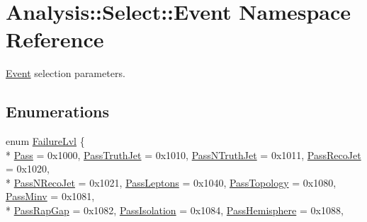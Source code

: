 \hypertarget{namespaceAnalysis_1_1Select_1_1Event}{}\section{Analysis\+:\+:Select\+:\+:Event Namespace Reference}
\label{namespaceAnalysis_1_1Select_1_1Event}


\hyperlink{namespaceAnalysis_1_1Select_1_1Event}{Event} selection parameters.  


\subsection*{Enumerations}
\begin{DoxyCompactItemize}
\item 
enum \hyperlink{namespaceAnalysis_1_1Select_1_1Event_a52c4d90d5d3ef88d9ca5c6a16798cbdb}{Failure\+Lvl} \{ \\*
\hyperlink{namespaceAnalysis_1_1Select_1_1Event_a52c4d90d5d3ef88d9ca5c6a16798cbdbab300d88a5e45155c13d5fa8a7ddc2936}{Pass} = 0x1000, 
\hyperlink{namespaceAnalysis_1_1Select_1_1Event_a52c4d90d5d3ef88d9ca5c6a16798cbdba056fdc52ce5e130e3852eb60f858dae5}{Pass\+Truth\+Jet} = 0x1010, 
\hyperlink{namespaceAnalysis_1_1Select_1_1Event_a52c4d90d5d3ef88d9ca5c6a16798cbdbab24a0d589dc8ab9acd357289823a21d6}{Pass\+N\+Truth\+Jet} = 0x1011, 
\hyperlink{namespaceAnalysis_1_1Select_1_1Event_a52c4d90d5d3ef88d9ca5c6a16798cbdba9deb9f05fec7e9c940d316129702eb43}{Pass\+Reco\+Jet} = 0x1020, 
\\*
\hyperlink{namespaceAnalysis_1_1Select_1_1Event_a52c4d90d5d3ef88d9ca5c6a16798cbdba6cef4b182b0e542eacc17c48e848704b}{Pass\+N\+Reco\+Jet} = 0x1021, 
\hyperlink{namespaceAnalysis_1_1Select_1_1Event_a52c4d90d5d3ef88d9ca5c6a16798cbdba1e121929bcd30b7e486e043304fc8db3}{Pass\+Leptons} = 0x1040, 
\hyperlink{namespaceAnalysis_1_1Select_1_1Event_a52c4d90d5d3ef88d9ca5c6a16798cbdba062782fa83f5c1a4e59975b92cb4db28}{Pass\+Topology} = 0x1080, 
\hyperlink{namespaceAnalysis_1_1Select_1_1Event_a52c4d90d5d3ef88d9ca5c6a16798cbdba66457f70b0c4e422ae854d1c58ff84e5}{Pass\+Minv} = 0x1081, 
\\*
\hyperlink{namespaceAnalysis_1_1Select_1_1Event_a52c4d90d5d3ef88d9ca5c6a16798cbdba0d92604fea84b8d1ce773870ede176c3}{Pass\+Rap\+Gap} = 0x1082, 
\hyperlink{namespaceAnalysis_1_1Select_1_1Event_a52c4d90d5d3ef88d9ca5c6a16798cbdba3584a8beaf61e1b99aa3111b0d007b2b}{Pass\+Isolation} = 0x1084, 
\hyperlink{namespaceAnalysis_1_1Select_1_1Event_a52c4d90d5d3ef88d9ca5c6a16798cbdba75b06ade68c8cbc18b581c238e5d1e32}{Pass\+Hemisphere} = 0x1088, 

\end{DoxyCompactItemize}
